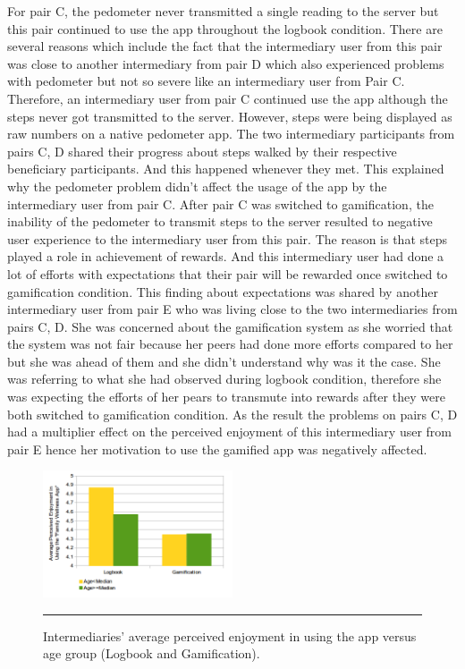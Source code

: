 \documentclass{sig-alternate}
\begin{document}
For pair C, the pedometer never transmitted a single reading to the server but this pair continued to use the app throughout the logbook condition. There are several reasons which include the fact that the intermediary user from this pair was close to another intermediary from pair D which also experienced problems with pedometer but not so severe like an intermediary user from Pair C. Therefore, an intermediary user from pair C continued use the app although the steps never got transmitted to the server. However, steps were being displayed as raw numbers on a native pedometer app. The two intermediary participants from pairs C, D shared their progress about steps walked by their respective beneficiary participants. And this happened whenever they met.  This explained why the pedometer problem didn't affect the usage of the app by the intermediary user from pair C. After pair C was switched to gamification, the inability of the pedometer to transmit steps to the server resulted to negative user experience to the intermediary user from this pair. The reason is that steps played a role in achievement of rewards. And this intermediary user had done a lot of efforts with expectations that their pair will be rewarded once switched to gamification condition. This finding about expectations was shared by another intermediary user from pair E who was living close  to the two intermediaries from pairs C, D. She was concerned about the gamification system as she worried that the system was not fair because her peers had done more efforts compared to her but she was ahead of them and she didn't understand why was it the case. She was referring to what she had observed during logbook condition,  therefore she was expecting the efforts of her pears to transmute into rewards after they were both switched to gamification condition.  As the result the problems on pairs C, D had a multiplier  effect on the perceived enjoyment of this intermediary user from pair E hence her motivation to use the gamified app was negatively affected.\newline 
\begin{figure}[htbp]
  \centering
    \includegraphics[width=0.5\textwidth]{PE_Interm_App_exp_seq.png}
    \rule{26em}{0.5pt}
  \caption{Intermediaries' average perceived enjoyment in using the app versus age group (Logbook and Gamification).}
  \label{figure:PE_Interm_App_exp_seq}
\end{figure}\newline
\end{document}
